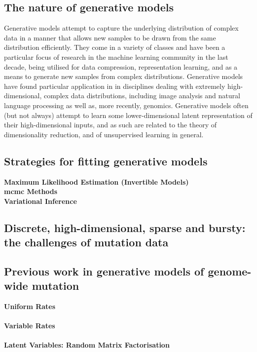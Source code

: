 \documentclass[../thesis.tex]{subfiles}
\begin{document}
\subsection{The nature of generative models}
Generative models attempt to capture the underlying distribution of complex data in a manner that allows new samples to be drawn from the same distribution efficiently. They come in a variety of classes and have been a particular focus of research in the machine learning community in the last decade, being utilised for data compression, representation learning, and as a means to generate new samples from complex distributions. Generative models have found particular application in  in disciplines dealing with extremely high-dimensional, complex data distributions, including image analysis and natural language processing as well as, more recently, genomics. Generative models often (but not always) attempt to learn some lower-dimensional latent representation of their high-dimensional inputs, and as such are related to the theory of dimensionality reduction, and of unsupervised learning in general. 



\subsection{Strategies for fitting generative models}
\textbf{Maximum Likelihood Estimation (Invertible Models)} \\
\textbf{\gls{mcmc} Methods} \\
\textbf{Variational Inference} \\
\citep{blei_variational_2017}


\subsection{Discrete, high-dimensional, sparse and bursty: the challenges of mutation data}

\citep{zhao_variational_2020}

\subsection{Previous work in generative models of genome-wide mutation}
\textbf{Uniform Rates} \\
\citep{budczies_optimizing_2019}  \\
\textbf{Variable Rates} \\
\citep{yao_ectmb_2020} \\
\textbf{Latent Variables: Random Matrix Factorisation} \\
\citep{fantini_mutsignatures_2020}
\end{document}
